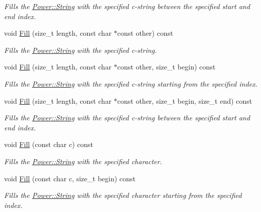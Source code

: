 \begin{DoxyCompactItemize}
\begin{DoxyCompactList}\small\item\em Fills the \hyperlink{class_power_1_1_string}{Power\+::\+String} with the specified c-\/string between the specified start and end index. \end{DoxyCompactList}\item 
void \hyperlink{class_power_1_1_string_a2b89a279228596cafa6232007c7cc218}{Fill} (size\+\_\+t length, const char $\ast$const other) const
\begin{DoxyCompactList}\small\item\em Fills the \hyperlink{class_power_1_1_string}{Power\+::\+String} with the specified c-\/string. \end{DoxyCompactList}\item 
void \hyperlink{class_power_1_1_string_adfd34ce7307abbb1ba9b0bb649e57e5f}{Fill} (size\+\_\+t length, const char $\ast$const other, size\+\_\+t begin) const
\begin{DoxyCompactList}\small\item\em Fills the \hyperlink{class_power_1_1_string}{Power\+::\+String} with the specified c-\/string starting from the specified index. \end{DoxyCompactList}\item 
void \hyperlink{class_power_1_1_string_a6df9549c970e255b68be62942f4d83ca}{Fill} (size\+\_\+t length, const char $\ast$const other, size\+\_\+t begin, size\+\_\+t end) const
\begin{DoxyCompactList}\small\item\em Fills the \hyperlink{class_power_1_1_string}{Power\+::\+String} with the specified c-\/string between the specified start and end index. \end{DoxyCompactList}\item 
void \hyperlink{class_power_1_1_string_a8dbe442eba279eaa441b8e99bc80cb5c}{Fill} (const char c) const
\begin{DoxyCompactList}\small\item\em Fills the \hyperlink{class_power_1_1_string}{Power\+::\+String} with the specified character. \end{DoxyCompactList}\item 
void \hyperlink{class_power_1_1_string_a2dbda22c03de5742b8cf4fbd075e9dfd}{Fill} (const char c, size\+\_\+t begin) const
\begin{DoxyCompactList}\small\item\em Fills the \hyperlink{class_power_1_1_string}{Power\+::\+String} with the specified character starting from the specified index. \end{DoxyCompactList}\item 

\end{DoxyCompactItemize}
